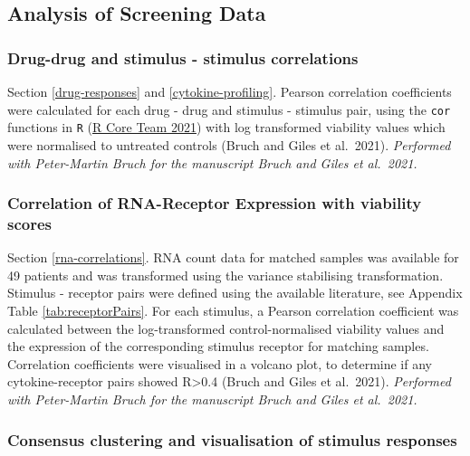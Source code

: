 \documentclass[11pt, a4paper, twosided]{book}
\begin{document}
\hypertarget{analysis-of-screening-data}{%
\subsection{Analysis of Screening Data}\label{analysis-of-screening-data}}

\hypertarget{correlations}{%
\subsubsection{Drug-drug and stimulus - stimulus correlations}\label{correlations}}

Section \ref{drug-responses} and \ref{cytokine-profiling}. Pearson correlation coefficients were calculated for each drug - drug and stimulus - stimulus pair, using the \texttt{cor} functions in \texttt{R} (\protect\hyperlink{ref-R-base}{R Core Team 2021}) with log transformed viability values which were normalised to untreated controls (Bruch and Giles et al.~2021). \emph{Performed with Peter-Martin Bruch for the manuscript Bruch and Giles et al.~2021.}

\hypertarget{correlation-of-rna-receptor-expression-with-viability-scores}{%
\subsubsection{Correlation of RNA-Receptor Expression with viability scores}\label{correlation-of-rna-receptor-expression-with-viability-scores}}

Section \ref{rna-correlations}. RNA count data for matched samples was available for 49 patients and was transformed using the variance stabilising transformation. Stimulus - receptor pairs were defined using the available literature, see Appendix Table \ref{tab:receptorPairs}. For each stimulus, a Pearson correlation coefficient was calculated between the log-transformed control-normalised viability values and the expression of the corresponding stimulus receptor for matching samples. Correlation coefficients were visualised in a volcano plot, to determine if any cytokine-receptor pairs showed R\textgreater0.4 (Bruch and Giles et al.~2021). \emph{Performed with Peter-Martin Bruch for the manuscript Bruch and Giles et al.~2021.}

\hypertarget{stimulus-heatmap-method}{%
\subsubsection{Consensus clustering and visualisation of stimulus responses}\label{stimulus-heatmap-method}}
\end{document}
